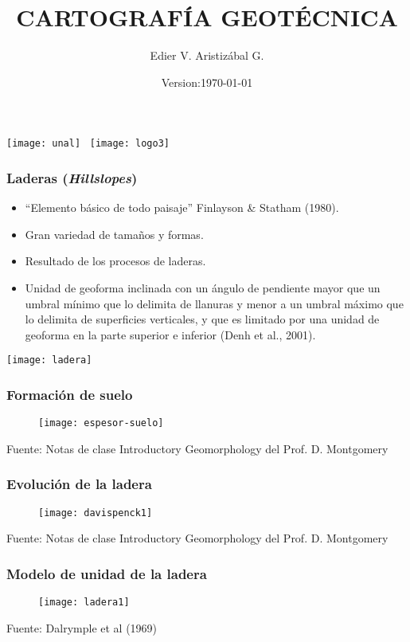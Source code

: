 \documentclass[12pt]{beamer}
\title[Hidrología \& Estabilidad de laderas]{CARTOGRAFÍA GEOTÉCNICA}
\author[Edier Aristizábal]{Edier V. Aristizábal G.}
\institute{\emph{evaristizabalg@unal.edu.co}}
\date{Version:\today}
\begin{document}
\begin{frame}
\titlepage
\centering
\texttt{[image: unal]}\hspace*{4.75cm}~%
\texttt{[image: logo3]} 
\end{frame}
\begin{frame}
\frametitle{Laderas (\emph{Hillslopes})}
\scriptsize{
\begin{itemize}
\item “Elemento básico de todo paisaje” {\tiny Finlayson \& Statham (1980)}.
\vfill
\item Gran variedad de tamaños y formas.
\vfill
\item Resultado de los procesos de laderas.
\vfill
\item Unidad de geoforma inclinada con un ángulo de pendiente mayor que un umbral mínimo que lo delimita de llanuras y menor a un umbral máximo que lo delimita de superficies verticales, y que es limitado por una unidad de geoforma en la parte superior e inferior {\tiny (Denh et al., 2001)}.
\end{itemize}
}
\texttt{[image: ladera]}
\end{frame}
\begin{frame}
\frametitle{Formación de suelo}
\begin{figure}
\centering
\texttt{[image: espesor-suelo]}
\end{figure}
\tiny{Fuente: Notas de clase Introductory Geomorphology del Prof. D. Montgomery }
\end{frame}
\begin{frame}
\frametitle{Evolución de la ladera}
\begin{figure}
\centering
\texttt{[image: davispenck1]}
\end{figure}
\tiny{Fuente: Notas de clase Introductory Geomorphology del Prof. D. Montgomery }
\end{frame}
\begin{frame}
\frametitle{Modelo de unidad de la ladera}
\begin{figure}
\centering
\texttt{[image: ladera1]}
\end{figure}
\tiny{Fuente: Dalrymple et al (1969)}
\end{frame}
\end{document}
